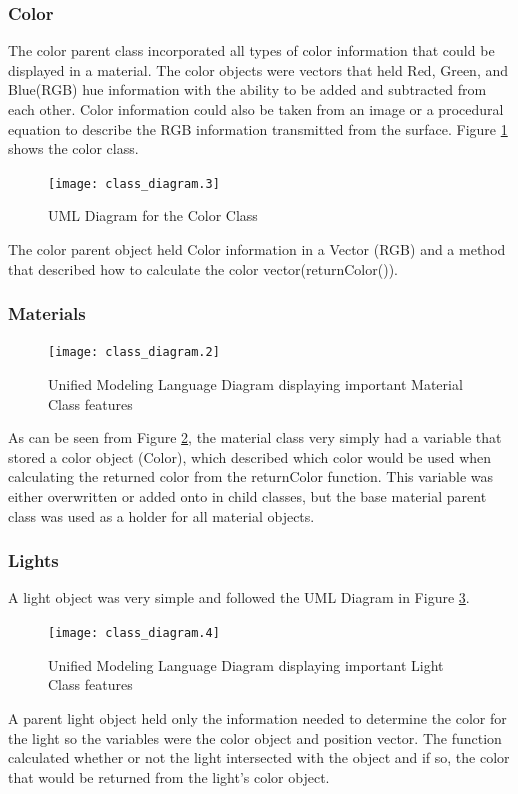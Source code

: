 \subsubsection{Color}
The color parent class incorporated all types of color information that could be displayed in a material.  The color objects were vectors that held Red, Green, and Blue(RGB) hue information with the ability to be added and subtracted from each other.  Color information could also be taken from an image or a procedural equation to describe the RGB information transmitted from the surface. Figure \ref{uml:colorclass} shows the color class.

\begin{figure}[ht]
\centering
\texttt{[image: class\_diagram.3]}
\caption{UML Diagram for the Color Class}
\label{uml:colorclass}
\end{figure}
The color parent object held Color information in a Vector (RGB) and a method that described how to calculate the color vector(returnColor()).

\subsubsection{Materials}
\begin{figure}[!ht]
\centering
	\texttt{[image: class\_diagram.2]}
\caption{Unified Modeling Language Diagram displaying important Material Class features}
\label{uml:materialclass}
\end{figure}

As can be seen from Figure \ref{uml:materialclass}, the material class very simply had a variable that stored a color object (Color), which described which color would be used when calculating the returned color from the returnColor function.  This variable was either overwritten or added onto in child classes, but the base material parent class was used as a holder for all material objects.
\subsubsection{Lights}
A light object was very simple and followed the UML Diagram in Figure \ref{uml:lightclass}.
\begin{figure}[!ht]
\centering
\texttt{[image: class\_diagram.4]}
\caption{Unified Modeling Language Diagram displaying important Light Class features}
\label{uml:lightclass}
\end{figure}
A parent light object held only the information needed to determine the color for the light so the variables were the color object and position vector. The function calculated whether or not the light intersected with the object and if so, the color that would be returned from the light's color object.

